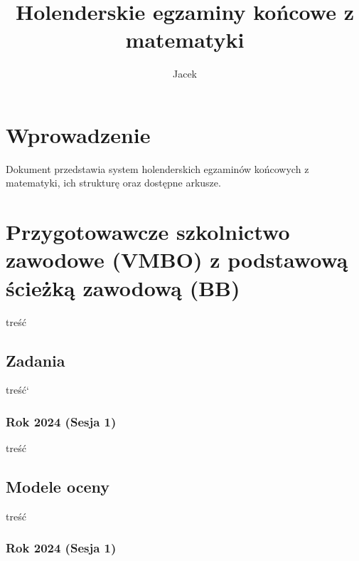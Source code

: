 \documentclass[
  letterpaper,
  DIV=11,
  numbers=noendperiod]{scrreprt}
\title{Holenderskie egzaminy końcowe z matematyki}
\author{Jacek}
\date{}
\renewcommand*\contentsname{Table of contents}
\newcommand\contentsname{Table of contents}
\begin{document}
\maketitle

\renewcommand*\contentsname{Spis treści}
{
\setcounter{tocdepth}{2}
\tableofcontents
}


\chapter{Wprowadzenie}\label{wprowadzenie}

Dokument przedstawia system holenderskich egzaminów końcowych z
matematyki, ich strukturę oraz dostępne arkusze.


\chapter{Przygotowawcze szkolnictwo zawodowe (VMBO) z podstawową ścieżką
zawodową
(BB)}\label{przygotowawcze-szkolnictwo-zawodowe-vmbo-z-podstawowux105-ux15bcieux17ckux105-zawodowux105-bb}

treść

\section{Zadania}\label{zadania}

treść`

\subsection{Rok 2024 (Sesja 1)}\label{rok-2024-sesja-1}

treść



\section{Modele oceny}\label{modele-oceny}

treść

\subsection{Rok 2024 (Sesja 1)}\label{rok-2024-sesja-1-1}


\end{document}
